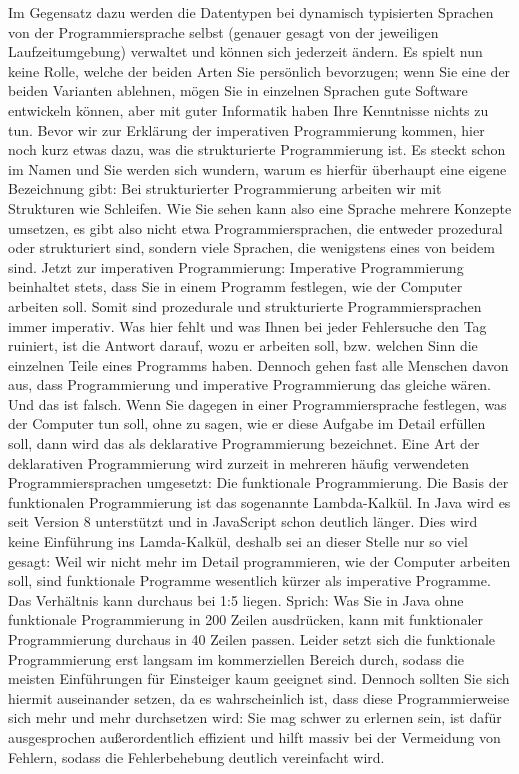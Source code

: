Im Gegensatz dazu werden die Datentypen bei dynamisch typisierten Sprachen von der Programmiersprache selbst (genauer gesagt von der jeweiligen Laufzeitumgebung) verwaltet und können sich jederzeit ändern. Es spielt nun keine Rolle, welche der beiden Arten Sie persönlich bevorzugen; wenn Sie eine der beiden Varianten ablehnen, mögen Sie in einzelnen Sprachen gute Software entwickeln können, aber mit guter Informatik haben Ihre Kenntnisse nichts zu tun.
Bevor wir zur Erklärung der imperativen Programmierung kommen, hier noch kurz etwas dazu, was die strukturierte Programmierung ist. Es steckt schon im Namen und Sie werden sich wundern, warum es hierfür überhaupt eine eigene Bezeichnung gibt: Bei strukturierter Programmierung arbeiten wir mit Strukturen wie Schleifen.
Wie Sie sehen kann also eine Sprache mehrere Konzepte umsetzen, es gibt also nicht etwa Programmiersprachen, die entweder prozedural oder strukturiert sind, sondern viele Sprachen, die wenigstens eines von beidem sind.
Jetzt zur imperativen Programmierung: Imperative Programmierung beinhaltet stets, dass Sie in einem Programm festlegen, wie der Computer arbeiten soll. Somit sind prozedurale und strukturierte Programmiersprachen immer imperativ. Was hier fehlt und was Ihnen bei jeder Fehlersuche den Tag ruiniert, ist die Antwort darauf, wozu er arbeiten soll, bzw. welchen Sinn die einzelnen Teile eines Programms haben. Dennoch gehen fast alle Menschen davon aus, dass Programmierung und imperative Programmierung das gleiche wären. Und das ist falsch.
Wenn Sie dagegen in einer Programmiersprache festlegen, was der Computer tun soll, ohne zu sagen, wie er diese Aufgabe im Detail erfüllen soll, dann wird das als deklarative Programmierung bezeichnet. Eine Art der deklarativen Programmierung wird zurzeit in mehreren  häufig verwendeten Programmiersprachen umgesetzt: Die funktionale Programmierung. Die Basis der funktionalen Programmierung ist das sogenannte Lambda-Kalkül. In Java wird es seit Version 8 unterstützt und in JavaScript schon deutlich länger.
Dies wird keine Einführung ins Lamda-Kalkül, deshalb sei an dieser Stelle nur so viel gesagt: Weil wir nicht mehr im Detail programmieren, wie der Computer arbeiten soll, sind funktionale Programme wesentlich kürzer als imperative Programme. Das Verhältnis kann durchaus bei 1:5 liegen. Sprich: Was Sie in Java ohne funktionale Programmierung in 200 Zeilen ausdrücken, kann mit funktionaler Programmierung durchaus in 40 Zeilen passen.
Leider setzt sich die funktionale Programmierung erst langsam im kommerziellen Bereich durch, sodass die meisten Einführungen für Einsteiger kaum geeignet sind. Dennoch sollten Sie sich hiermit auseinander setzen, da es wahrscheinlich ist, dass diese Programmierweise sich mehr und mehr durchsetzen wird: Sie mag schwer zu erlernen sein, ist dafür ausgesprochen außerordentlich effizient und hilft massiv bei der Vermeidung von Fehlern, sodass die Fehlerbehebung deutlich vereinfacht wird.
